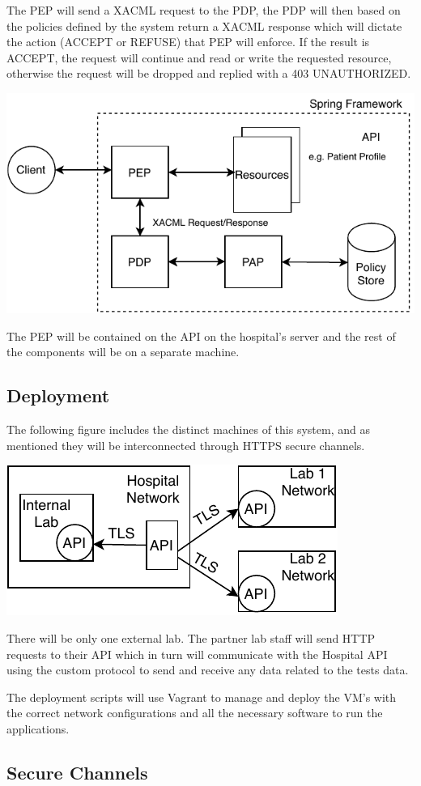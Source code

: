 The PEP will send a XACML\cite{xacml} request to the PDP, the PDP will then based on the policies defined by the system return a XACML response which will dictate the action (ACCEPT or REFUSE) that PEP will enforce. If the result is ACCEPT, the request will continue and read or write the requested resource, otherwise the request will be dropped and replied with a 403 UNAUTHORIZED.

	\includegraphics[width=.6\textwidth]{figs/access_control.pdf}


The PEP will be  contained on the API on the hospital's server and the rest of the components will be on a separate machine.

\subsection{Deployment}
The following figure includes the distinct machines of this system, and as mentioned they will be interconnected through HTTPS secure channels.

	\includegraphics[width=.4\textwidth]{figs/infrastructure.pdf}

There will be only one external lab. The partner lab staff will send HTTP requests to their API which in turn will communicate with the Hospital API using the custom protocol to send and receive any data related to the tests data.

The deployment scripts will use Vagrant\cite{vagrant} to manage and deploy the VM's with the correct network configurations and all the necessary software to run the applications. \\

\subsection{Secure Channels}

